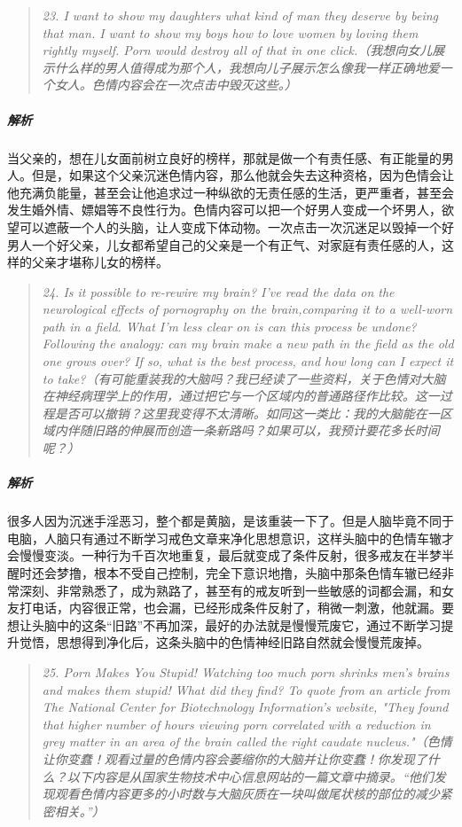 \begin{quote}\it
    23. I want to show my daughters what kind of man they deserve by being that man. I want to show my boys how to love women by loving them rightly myself. Porn would destroy all of that in one click.（我想向女儿展示什么样的男人值得成为那个人，我想向儿子展示怎么像我一样正确地爱一个女人。色情内容会在一次点击中毁灭这些。）
\end{quote}

\subparagraph{解析} 当父亲的，想在儿女面前树立良好的榜样，那就是做一个有责任感、有正能量的男人。但是，如果这个父亲沉迷色情内容，那么他就会失去这种资格，因为色情会让他充满负能量，甚至会让他追求过一种纵欲的无责任感的生活，更严重者，甚至会发生婚外情、嫖娼等不良性行为。色情内容可以把一个好男人变成一个坏男人，欲望可以遮蔽一个人的头脑，让人变成下体动物。一次点击一次沉迷足以毁掉一个好男人一个好父亲，儿女都希望自己的父亲是一个有正气、对家庭有责任感的人，这样的父亲才堪称儿女的榜样。

\begin{quote}\it
    24. Is it possible to re-rewire my brain? I've read the data on the neurological effects of pornography on the brain,comparing it to a well-worn path in a field. What I'm less clear on is can this process be undone? Following the analogy: can my brain make a new path in the field as the old one grows over? If so, what is the best process, and how long can I expect it to take?（有可能重装我的大脑吗？我已经读了一些资料，关于色情对大脑在神经病理学上的作用，通过把它与一个区域内的普通路径作比较。这一过程是否可以撤销？这里我变得不太清晰。如同这一类比：我的大脑能在一区域内伴随旧路的伸展而创造一条新路吗？如果可以，我预计要花多长时间呢？）
\end{quote}

\subparagraph{解析} 很多人因为沉迷手淫恶习，整个都是黄脑，是该重装一下了。但是人脑毕竟不同于电脑，人脑只有通过不断学习戒色文章来净化思想意识，这样头脑中的色情车辙才会慢慢变淡。一种行为千百次地重复，最后就变成了条件反射，很多戒友在半梦半醒时还会梦撸，根本不受自己控制，完全下意识地撸，头脑中那条色情车辙已经非常深刻、非常熟悉了，成为熟路了，甚至有的戒友听到一些敏感的词都会漏，和女友打电话，内容很正常，也会漏，已经形成条件反射了，稍微一刺激，他就漏。要想让头脑中的这条“旧路”不再加深，最好的办法就是慢慢荒废它，通过不断学习提升觉悟，思想得到净化后，这条头脑中的色情神经旧路自然就会慢慢荒废掉。

\begin{quote}\it
    25. Porn Makes You Stupid! Watching too much porn shrinks men’s brains and makes them stupid! What did they find? To quote from an article from The National Center for Biotechnology Information's website, "They found that higher number of hours viewing porn correlated with a reduction in grey matter in an area of the brain called the right caudate nucleus."（色情让你变蠢！观看过量的色情内容会萎缩你的大脑并让你变蠢！你发现了什么？以下内容是从国家生物技术中心信息网站的一篇文章中摘录。“他们发现观看色情内容更多的小时数与大脑灰质在一块叫做尾状核的部位的减少紧密相关。”）
\end{quote}

